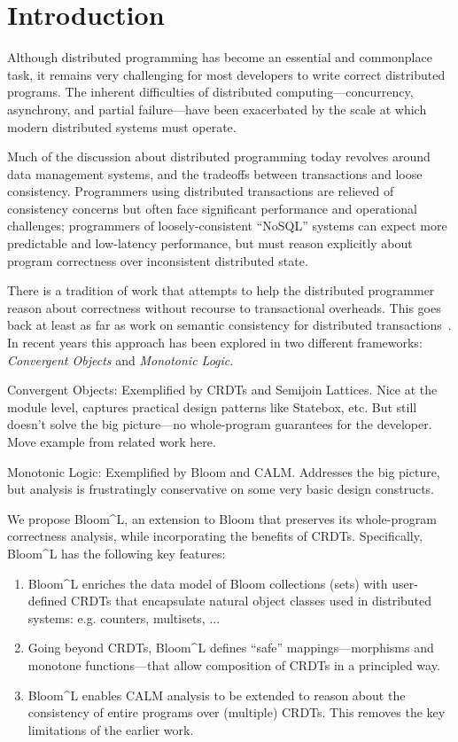 \section{Introduction}
\label{sec:intro}
Although distributed programming has become an essential and commonplace task,
it remains very challenging for most developers to write correct distributed
programs. The inherent difficulties of distributed computing---concurrency,
asynchrony, and partial failure---have been exacerbated by the scale at which
modern distributed systems must operate.

Much of the discussion about distributed programming today revolves around data management systems, and the tradeoffs between transactions and loose consistency.  Programmers using distributed transactions are relieved of consistency concerns but often face significant performance and operational challenges; programmers of loosely-consistent ``NoSQL'' systems can expect more predictable and low-latency performance, but must reason explicitly about program correctness over inconsistent distributed state.

There is a tradition of work that attempts to help the distributed programmer reason about correctness without recourse to transactional overheads. This goes back at least as far as work on semantic consistency for distributed transactions~\cite{Garcia-Molina1983,Farrag1989}.  In recent years this approach has been explored in two different frameworks: {\em Convergent Objects} and {\em Monotonic Logic}.

Convergent Objects: Exemplified by CRDTs and Semijoin Lattices.  Nice at the module level, captures practical design patterns like Statebox, etc. But still doesn't solve the big picture---no whole-program guarantees for the developer.  Move example from related work here.


Monotonic Logic: Exemplified by Bloom and CALM.  Addresses the big picture, but analysis is frustratingly conservative on some very basic design constructs.



We propose Bloom^L, an extension to Bloom that preserves its whole-program correctness analysis, while incorporating the benefits of CRDTs.  Specifically, Bloom^L has the following key features:

\begin{enumerate}
\item Bloom^L enriches the data model of Bloom collections (sets) with user-defined CRDTs that encapsulate natural object classes used in distributed systems: e.g. counters, multisets, ...

\item Going beyond CRDTs, Bloom^L defines ``safe'' mappings---morphisms and monotone functions---that allow composition of CRDTs in a principled way.

\item Bloom^L enables CALM analysis to be extended to reason about the consistency of entire programs over (multiple) CRDTs.  This removes the key limitations of the earlier work.
\end{enumerate}




  
